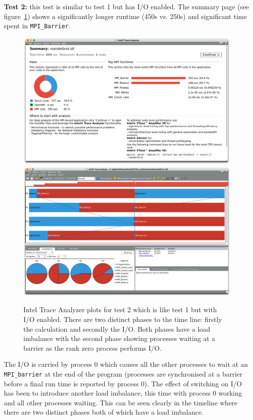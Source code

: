 \documentclass[a4paper,titlepage]{article}
\begin{document}
\noindent
\textbf{Test 2:} this test is similar to test 1 but has I/O enabled. The summary page (see figure~\ref{fig:test2_ITAC_summary}) shows a significantly longer runtime (450s vs. 250s) and significant time spent in \verb+MPI_Barrier+. 
\begin{figure}[htbp]
\begin{center}
\includegraphics[scale=0.3]{figures/test2_summary}
\includegraphics[scale=0.3]{figures/test2_eventTimeline}
\caption{Intel Trace Analyzer plots for test 2 which is like test 1 but with I/O enabled. There are two distinct phases to the time line: firstly the calculation and secondly the I/O. Both phases have a load imbalance with the second phase showing processes waiting at a barrier as the rank zero process performs I/O.}
\label{fig:test2_ITAC_summary}
\end{center}
\end{figure}
The I/O is carried by process 0 which causes all the other processes to wait at an \verb+MPI_barrier+ at the end of the program (processes are synchronised at a barrier before a final run time is reported by process 0). The effect of switching on I/O has been to introduce another load imbalance, this time with process 0 working and all other processes waiting. This can be seen clearly in the timeline where there are two distinct phases both of which have a load imbalance. \\
\end{document}
